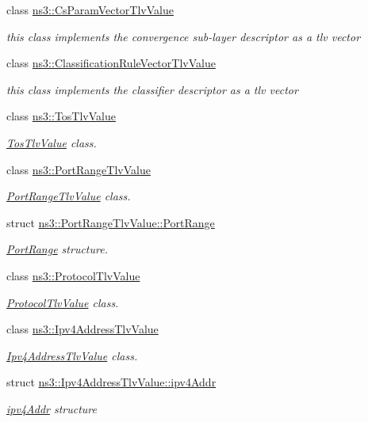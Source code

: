 \begin{DoxyCompactItemize}
class \hyperlink{classns3_1_1CsParamVectorTlvValue}{ns3\+::\+Cs\+Param\+Vector\+Tlv\+Value}
\begin{DoxyCompactList}\small\item\em this class implements the convergence sub-\/layer descriptor as a tlv vector \end{DoxyCompactList}\item 
class \hyperlink{classns3_1_1ClassificationRuleVectorTlvValue}{ns3\+::\+Classification\+Rule\+Vector\+Tlv\+Value}
\begin{DoxyCompactList}\small\item\em this class implements the classifier descriptor as a tlv vector \end{DoxyCompactList}\item 
class \hyperlink{classns3_1_1TosTlvValue}{ns3\+::\+Tos\+Tlv\+Value}
\begin{DoxyCompactList}\small\item\em \hyperlink{classns3_1_1TosTlvValue}{Tos\+Tlv\+Value} class. \end{DoxyCompactList}\item 
class \hyperlink{classns3_1_1PortRangeTlvValue}{ns3\+::\+Port\+Range\+Tlv\+Value}
\begin{DoxyCompactList}\small\item\em \hyperlink{classns3_1_1PortRangeTlvValue}{Port\+Range\+Tlv\+Value} class. \end{DoxyCompactList}\item 
struct \hyperlink{structns3_1_1PortRangeTlvValue_1_1PortRange}{ns3\+::\+Port\+Range\+Tlv\+Value\+::\+Port\+Range}
\begin{DoxyCompactList}\small\item\em \hyperlink{structns3_1_1PortRangeTlvValue_1_1PortRange}{Port\+Range} structure. \end{DoxyCompactList}\item 
class \hyperlink{classns3_1_1ProtocolTlvValue}{ns3\+::\+Protocol\+Tlv\+Value}
\begin{DoxyCompactList}\small\item\em \hyperlink{classns3_1_1ProtocolTlvValue}{Protocol\+Tlv\+Value} class. \end{DoxyCompactList}\item 
class \hyperlink{classns3_1_1Ipv4AddressTlvValue}{ns3\+::\+Ipv4\+Address\+Tlv\+Value}
\begin{DoxyCompactList}\small\item\em \hyperlink{classns3_1_1Ipv4AddressTlvValue}{Ipv4\+Address\+Tlv\+Value} class. \end{DoxyCompactList}\item 
struct \hyperlink{structns3_1_1Ipv4AddressTlvValue_1_1ipv4Addr}{ns3\+::\+Ipv4\+Address\+Tlv\+Value\+::ipv4\+Addr}
\begin{DoxyCompactList}\small\item\em \hyperlink{structns3_1_1Ipv4AddressTlvValue_1_1ipv4Addr}{ipv4\+Addr} structure \end{DoxyCompactList}\end{DoxyCompactItemize}
